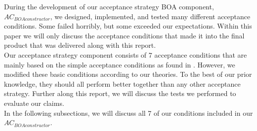 During the development of our acceptance strategy BOA component, $AC_{BOAconstructor}$, we designed, implemented, and tested many different acceptance conditions. Some failed horribly, but some exceeded our expectations. Within this paper we will only discuss the acceptance conditions that made it into the final product that was delivered along with this report.\\

Our acceptance strategy component consists of 7 acceptance conditions that are mainly based on the simple acceptance conditions as found in \cite{baarslag2013acceptance}. However, we modified these basic conditions according to our theories. To the best of our prior knowledge, they should all perform better together than any other acceptance strategy. Further along this report, we will discuss the tests we performed to evaluate our claims.\\

In the following subsections, we will discuss all 7 of our conditions included in our $AC_{BOAconstructor}$.

